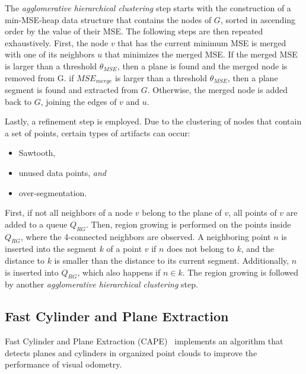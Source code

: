 \documentclass[main.tex]{subfiles}
\begin{document}
The \textit{agglomerative hierarchical clustering} step starts with the construction of a min-MSE-heap data 
structure that contains the nodes of $G$, sorted in ascending order by the value of their MSE. 
The following steps are then repeated exhaustively.
First, the node $v$ that has the current minimum MSE is merged with one of its neighbors $u$ that minimizes the merged MSE.
If the merged MSE is larger than a threshold $\theta_{MSE}$, then a plane is found and the merged node is removed from G.
if $MSE_{merge}$ is larger than a threshold $\theta_{MSE}$, then a plane segment is found and extracted from $G$.
Otherwise, the merged node is added back to $G$, joining the edges of $v$ and $u$.

Lastly, a refinement step is employed. Due to the clustering of nodes that contain a set of points, certain types of 
artifacts can occur:
\begin{itemize}
    \item Sawtooth,
    \item unused data points, \textit{and} 
    \item over-segmentation.
\end{itemize}
First, if not all neighbors of a node $v$ belong to the plane of $v$, all points of $v$ are added to a queue $Q_{RG}$.
Then, region growing is performed on the points inside $Q_{RG}$, where the 4-connected neighbors are observed. 
A neighboring point $n$ is inserted into the segment $k$ of a point $v$ if $n$ does not belong to $k$, and
the distance to $k$ is smaller than the distance to its current segment. Additionally, $n$ is inserted into $Q_{RG}$, 
which also happens if $n \in k$.
The region growing is followed by another \textit{agglomerative hierarchical clustering} step. 


\subsection{Fast Cylinder and Plane Extraction}
Fast Cylinder and Plane Extraction (CAPE)~\cite{Proença_Gao_2018} implements an algorithm that detects planes and cylinders in organized point clouds to improve the performance
of visual odometry.
\end{document}
